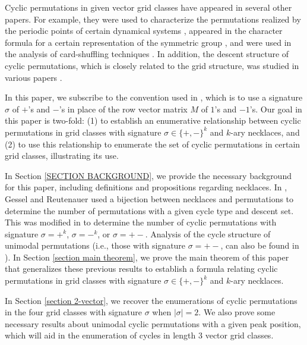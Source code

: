 \documentclass[12pt]{article}
\newcommand{\todo}[1]{\vspace{2 mm}\par\noindent
   \marginpar[\flushright\textsc{ToDo}]{\textsc{ToDo}}\framebox{\begin{minipage}[c]{\textwidth}
   \tt #1 \end{minipage}}\vspace{2 mm}\par}
\theoremstyle{plain}
\theoremstyle{definition}
\begin{document}
Cyclic permutations in given vector grid classes have appeared in several other papers. For example, they were used to characterize the permutations realized by the periodic points of certain dynamical systems \cite{ARCHERELIZALDE2014}, appeared in the character formula for a certain representation of the symmetric group \cite{ARCHER2016}, and were used in the analysis of card-shuffling techniques \cite{DFH2013}. %
 In addition, the descent structure of cyclic permutations, which is closely related to the grid structure, was studied in various papers \cite{gessel, ELIZALDE11, BARIL13}.
 
 In this paper, we subscribe to the convention used in \cite{ARCHERELIZALDE2014}, which is to use a signature $\sigma$ of $+$'s and $-$'s in place of the row vector matrix $M$ of $1$'s and $-1$'s. 
 Our goal in this paper is two-fold: (1) to establish an enumerative relationship between cyclic permutations in grid classes with signature $\sigma\in\{+,-\}^k$ and $k$-ary necklaces, and (2) to use this relationship to enumerate the set of cyclic permutations in certain grid classes, illustrating its use.
 
 In Section  \ref{SECTION BACKGROUND}, we provide the necessary background for this paper, including definitions and propositions regarding necklaces. In \cite{gessel}, Gessel and Reutenauer used a bijection between necklaces and permutations to determine the number of permutations with a given cycle type and descent set. This was modified in \cite{ARCHERELIZALDE2014} to determine the number of cyclic permutations with signature $\sigma=+^k$, $\sigma=-^k$, or $\sigma=+-$. Analysis of the cycle structure of unimodal permutations (i.e., those with signature $\sigma=+-$, can also be found in \cite{WeissRogers, Thibon, Gannon}). In Section \ref{section main theorem}, we prove the main theorem of this paper that generalizes these previous results to establish a formula relating cyclic permutations in grid classes with signature $\sigma\in\{+,-\}^k$ and $k$-ary necklaces.
 
 In Section \ref{section 2-vector}, we recover the enumerations of cyclic permutations in the four grid classes with signature $\sigma$ when $|\sigma|=2$.
 We also prove some necessary results about unimodal cyclic permutations with a given peak position, which will aid in the enumeration of cycles in length 3 vector grid classes.
 
\end{document}
